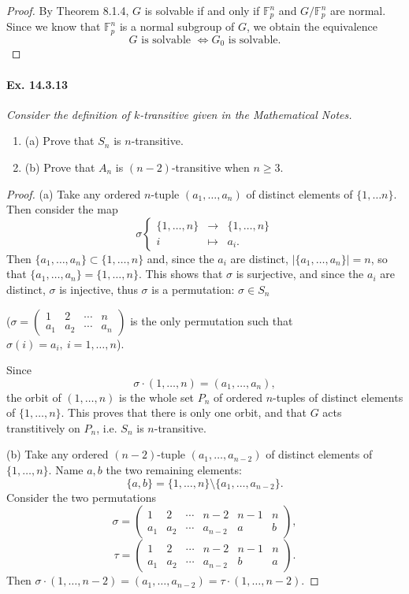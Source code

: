 \documentclass[11pt,a4paper]{article}
\newcommand{\be} {\begin{enumerate}}
\newcommand{\ee} {\end{enumerate}}
\newcommand{\F}{\mathbb{F}}
\begin{document}
\begin{proof}
By Theorem 8.1.4, $G$ is solvable if and only if $\F_p^n$ and $G/\F_p^n$ are normal. Since we know that  $\F_p^n$  is a normal subgroup of $G$, we obtain the equivalence
$$G \text{ is solvable } \iff G_0 \text { is solvable.}$$
 \end{proof}
 
 
  \paragraph{Ex. 14.3.13}{\it Consider the definition of $k$-transitive given in the Mathematical Notes.
  \be
  \item[(a)] Prove that $S_n$ is $n$-transitive.
  \item[(b)] Prove that $A_n$ is $(n-2)$-transitive when $n\geq 3$.
  \ee
  }
  \begin{proof}
 \item[(a)] Take any ordered $n$-tuple $(a_1,\ldots,a_n)$ of distinct elements of $\{1,\ldots n\}$. Then consider the map 
  $$
  \sigma
  \left\{
  \begin{array}{ccc}
  \{1,\ldots,n\} & \to &\{1,\ldots,n\}\\
  i &\mapsto &a_i.
  \end{array}
  \right.
  $$
  Then $\{a_1,\ldots,a_n\} \subset \{1,\ldots,n\}$ and, since the $a_i$ are distinct, $|\{a_1,\ldots,a_n\}| = n$, so that $\{a_1,\ldots,a_n\} = \{1,\ldots,n\}$. This shows that $\sigma$ is surjective, and since the $a_i$ are distinct, $\sigma$ is injective, thus $\sigma$ is a permutation: $\sigma \in S_n$
  
   ($\sigma =
   \left(
   \begin{array}{cccc}
   1&2&\cdots&n\\
   a_1&a_2&\cdots&a_n
   \end{array}
   \right)
   $ is the only permutation such that $\sigma(i) = a_i,\ i=1,\ldots,n$).
 
 Since 
$$\sigma\cdot(1,\ldots,n) = (a_1,\ldots,a_n),$$
the orbit of $(1,\ldots,n)$ is the whole set $P_n$ of ordered $n$-tuples of distinct elements of $\{1,\ldots,n\}$. This proves that there is only one orbit, and that $G$ acts transtitively on $P_n$, i.e. $S_n$ is $n$-transitive.

\item[(b)] Take any ordered $(n-2)$-tuple $(a_1,\ldots,a_{n-2})$ of distinct elements of $\{1,\ldots,n\}$. Name $a,b$ the two remaining elements:
$$\{a,b\} = \{1,\ldots,n\} \setminus \{a_1,\ldots,a_{n-2}\}.$$
Consider the two permutations
$$
\sigma =
   \left(
   \begin{array}{cccccc}
   1&2&\cdots&n-2 & n-1&n\\
   a_1&a_2&\cdots&a_{n-2}& a & b
   \end{array}
   \right),
 $$
 $$
\tau =
   \left(
   \begin{array}{cccccc}
   1&2&\cdots&n-2 & n-1&n\\
   a_1&a_2&\cdots&a_{n-2}& b & a
   \end{array}
   \right).
 $$
 Then $\sigma\cdot (1,\ldots,n-2) = (a_1,\ldots,a_{n-2}) = \tau\cdot (1,\ldots,n-2)$.
 

\end{proof}
\end{document}

